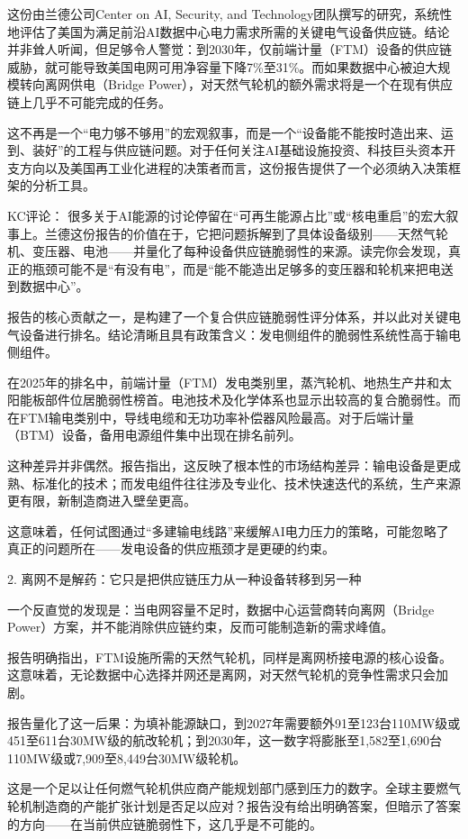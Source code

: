 \documentclass[11pt]{ctexart}
\begin{document}
这份由兰德公司Center on AI, Security, and Technology团队撰写的研究，系统性地评估了美国为满足前沿AI数据中心电力需求所需的关键电气设备供应链。结论并非耸人听闻，但足够令人警觉：到2030年，仅前端计量（FTM）设备的供应链威胁，就可能导致美国电网可用净容量下降7\%至31\%。而如果数据中心被迫大规模转向离网供电（Bridge Power），对天然气轮机的额外需求将是一个在现有供应链上几乎不可能完成的任务。

这不再是一个“电力够不够用”的宏观叙事，而是一个“设备能不能按时造出来、运到、装好”的工程与供应链问题。对于任何关注AI基础设施投资、科技巨头资本开支方向以及美国再工业化进程的决策者而言，这份报告提供了一个必须纳入决策框架的分析工具。

KC评论： 很多关于AI能源的讨论停留在“可再生能源占比”或“核电重启”的宏大叙事上。兰德这份报告的价值在于，它把问题拆解到了具体设备级别——天然气轮机、变压器、电池——并量化了每种设备供应链脆弱性的来源。读完你会发现，真正的瓶颈可能不是“有没有电”，而是“能不能造出足够多的变压器和轮机来把电送到数据中心”。

报告的核心贡献之一，是构建了一个复合供应链脆弱性评分体系，并以此对关键电气设备进行排名。结论清晰且具有政策含义：发电侧组件的脆弱性系统性高于输电侧组件。

在2025年的排名中，前端计量（FTM）发电类别里，蒸汽轮机、地热生产井和太阳能板部件位居脆弱性榜首。电池技术及化学体系也显示出较高的复合脆弱性。而在FTM输电类别中，导线电缆和无功功率补偿器风险最高。对于后端计量（BTM）设备，备用电源组件集中出现在排名前列。

这种差异并非偶然。报告指出，这反映了根本性的市场结构差异：输电设备是更成熟、标准化的技术；而发电组件往往涉及专业化、技术快速迭代的系统，生产来源更有限，新制造商进入壁垒更高。

这意味着，任何试图通过“多建输电线路”来缓解AI电力压力的策略，可能忽略了真正的问题所在——发电设备的供应瓶颈才是更硬的约束。

2. 离网不是解药：它只是把供应链压力从一种设备转移到另一种

一个反直觉的发现是：当电网容量不足时，数据中心运营商转向离网（Bridge Power）方案，并不能消除供应链约束，反而可能制造新的需求峰值。

报告明确指出，FTM设施所需的天然气轮机，同样是离网桥接电源的核心设备。这意味着，无论数据中心选择并网还是离网，对天然气轮机的竞争性需求只会加剧。

报告量化了这一后果：为填补能源缺口，到2027年需要额外91至123台110MW级或451至611台30MW级的航改轮机；到2030年，这一数字将膨胀至1,582至1,690台110MW级或7,909至8,449台30MW级轮机。

这是一个足以让任何燃气轮机供应商产能规划部门感到压力的数字。全球主要燃气轮机制造商的产能扩张计划是否足以应对？报告没有给出明确答案，但暗示了答案的方向——在当前供应链脆弱性下，这几乎是不可能的。
\end{document}
